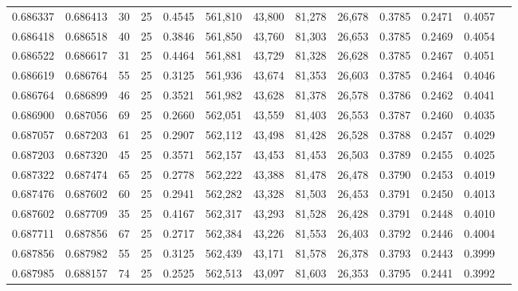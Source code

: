 \begin{tabular}{rrrrrrrrrrrrr}
0.686337 & 0.686413 &    30 &  25 &                                     0.4545 & 561,810 &  43,800 &  81,278 &  26,678 & 0.3785 & 0.2471 & 0.4057 \\
0.686418 & 0.686518 &    40 &  25 &                                     0.3846 & 561,850 &  43,760 &  81,303 &  26,653 & 0.3785 & 0.2469 & 0.4054 \\
0.686522 & 0.686617 &    31 &  25 &                                     0.4464 & 561,881 &  43,729 &  81,328 &  26,628 & 0.3785 & 0.2467 & 0.4051 \\
0.686619 & 0.686764 &    55 &  25 &                                     0.3125 & 561,936 &  43,674 &  81,353 &  26,603 & 0.3785 & 0.2464 & 0.4046 \\
0.686764 & 0.686899 &    46 &  25 &                                     0.3521 & 561,982 &  43,628 &  81,378 &  26,578 & 0.3786 & 0.2462 & 0.4041 \\
0.686900 & 0.687056 &    69 &  25 &                                     0.2660 & 562,051 &  43,559 &  81,403 &  26,553 & 0.3787 & 0.2460 & 0.4035 \\
0.687057 & 0.687203 &    61 &  25 &                                     0.2907 & 562,112 &  43,498 &  81,428 &  26,528 & 0.3788 & 0.2457 & 0.4029 \\
0.687203 & 0.687320 &    45 &  25 &                                     0.3571 & 562,157 &  43,453 &  81,453 &  26,503 & 0.3789 & 0.2455 & 0.4025 \\
0.687322 & 0.687474 &    65 &  25 &                                     0.2778 & 562,222 &  43,388 &  81,478 &  26,478 & 0.3790 & 0.2453 & 0.4019 \\
0.687476 & 0.687602 &    60 &  25 &                                     0.2941 & 562,282 &  43,328 &  81,503 &  26,453 & 0.3791 & 0.2450 & 0.4013 \\
0.687602 & 0.687709 &    35 &  25 &                                     0.4167 & 562,317 &  43,293 &  81,528 &  26,428 & 0.3791 & 0.2448 & 0.4010 \\
0.687711 & 0.687856 &    67 &  25 &                                     0.2717 & 562,384 &  43,226 &  81,553 &  26,403 & 0.3792 & 0.2446 & 0.4004 \\
0.687856 & 0.687982 &    55 &  25 &                                     0.3125 & 562,439 &  43,171 &  81,578 &  26,378 & 0.3793 & 0.2443 & 0.3999 \\
0.687985 & 0.688157 &    74 &  25 &                                     0.2525 & 562,513 &  43,097 &  81,603 &  26,353 & 0.3795 & 0.2441 & 0.3992 \\

\end{tabular}
